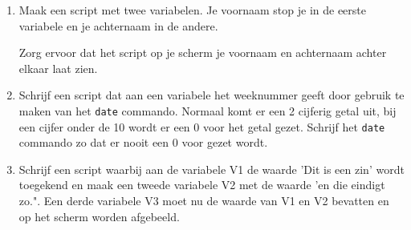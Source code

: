 \begin{enumerate}
\item Maak een script met twee variabelen. Je voornaam stop je in de eerste variabele en je achternaam in de andere.
	
	Zorg ervoor dat het script op je scherm je voornaam en achternaam achter elkaar laat zien.
\item Schrijf een script dat aan een variabele het weeknummer geeft door gebruik te maken van het \texttt{date} commando. Normaal komt er een 2 cijferig getal uit, bij een cijfer onder de 10 wordt er een 0 voor het getal gezet. Schrijf het \texttt{date} commando zo dat er nooit een 0 voor gezet wordt.
\item Schrijf een script waarbij aan de variabele V1 de waarde 'Dit is een zin' wordt toegekend en maak een tweede variabele V2 met de waarde 'en die eindigt zo.". Een derde variabele V3 moet nu de waarde van V1 en V2 bevatten en op het scherm worden afgebeeld.
\end{enumerate}
